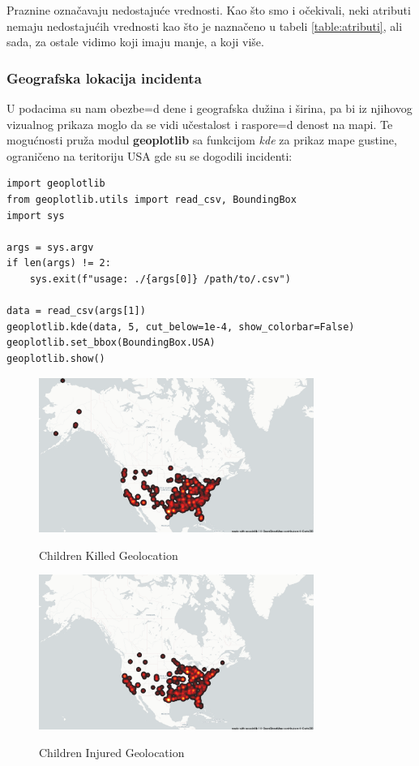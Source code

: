 \documentclass[12pt, a4paper]{article}
\def\dj{\leavevmode\setbox0=\hbox{d}\kern0pt
\rlap{\kern.215em\raise.46\ht0\hbox{-}}d}
\begin{document}
Praznine ozna\v cavaju nedostaju\' ce vrednosti. Kao \v sto smo i o\v cekivali, neki atributi nemaju nedostaju\' cih vrednosti kao \v sto je nazna\v ceno u tabeli \ref{table:atributi}, ali sada, za ostale vidimo koji imaju manje, a koji vi\v se.


\subsubsection{Geografska lokacija incidenta}
U podacima su nam obezbe\dj ene i geografska du\v zina i \v sirina, pa bi iz njihovog vizualnog prikaza moglo da se vidi u\v cestalost i raspore\dj enost na mapi. Te mogu\' cnosti pru\v za modul \textbf{geoplotlib} sa funkcijom \textit{kde} za prikaz mape gustine, ograni\v ceno na teritoriju USA gde su se dogodili incidenti:

\begin{lstlisting}
import geoplotlib
from geoplotlib.utils import read_csv, BoundingBox
import sys

args = sys.argv
if len(args) != 2:
    sys.exit(f"usage: ./{args[0]} /path/to/.csv")

data = read_csv(args[1])
geoplotlib.kde(data, 5, cut_below=1e-4, show_colorbar=False)
geoplotlib.set_bbox(BoundingBox.USA)
geoplotlib.show()
\end{lstlisting}

\begin{figure}[H]
\centering
\includegraphics[width=0.8\textwidth]{geo_children_killed.png}
\label{fig:KilledGeo1}
\caption{Children Killed Geolocation}\hspace{0.5cm} \break
\includegraphics[width=0.8\textwidth]{geo_children_injured.png}
\label{fig:KilledGeo2}
\caption{Children Injured Geolocation}
\end{figure}
\end{document}
